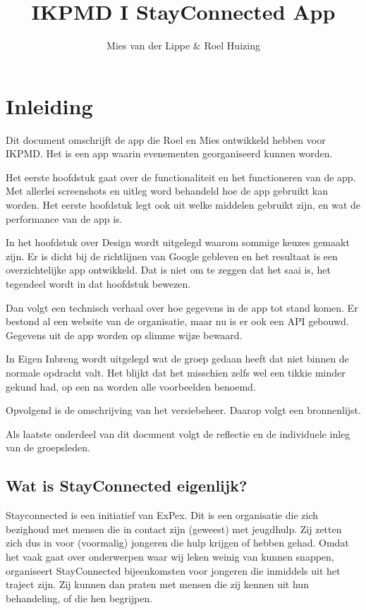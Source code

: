 \documentclass[dutch]{report}
\author{Mies van der Lippe \& Roel Huizing}
\title{IKPMD I StayConnected App}
\begin{document}
	
	
	\tableofcontents

	\newpage
	
	\section{Inleiding}
	Dit document omschrijft de app die Roel en Mies ontwikkeld hebben voor IKPMD. Het is een app waarin evenementen georganiseerd kunnen worden. 
	
	Het eerste hoofdstuk gaat over de functionaliteit en het functioneren van de app. Met allerlei screenshots en uitleg word behandeld hoe de 
	app gebruikt kan worden. Het eerste hoofdstuk legt ook uit welke middelen gebruikt zijn, en wat de performance van de app is. 
	
	In het hoofdstuk over Design wordt uitgelegd waarom sommige keuzes gemaakt zijn. Er is dicht bij de richtlijnen van Google gebleven en 
	het resultaat is een overzichtelijke app ontwikkeld. Dat is niet om te zeggen dat het saai is, het tegendeel wordt in dat hoofdstuk bewezen. 
	
	Dan volgt een technisch verhaal over hoe gegevens in de app tot stand komen. Er bestond al een website van de organisatie, maar nu is er ook 
	een API gebouwd. Gegevens uit de app worden op slimme wijze bewaard. 
	
	In Eigen Inbreng wordt uitgelegd wat de groep gedaan heeft dat niet binnen de normale opdracht valt. Het blijkt dat het misschien zelfs wel een
	tikkie minder gekund had, op een na worden alle voorbeelden benoemd. 
	
	Opvolgend is de omschrijving van het versiebeheer. Daarop volgt een bronnenlijst. 
	
	Als laatste onderdeel van dit document volgt de reflectie en de individuele inleg van de groepsleden. 
	
	\subsection{Wat is StayConnected eigenlijk?}
	Stayconnected is een initiatief van ExPex. Dit is een organisatie die zich bezighoud met mensen die in contact zijn (geweest) met jeugdhulp. Zij 
	zetten zich dus in voor (voormalig) jongeren die hulp krijgen of hebben gehad. Omdat het vaak gaat over onderwerpen waar wij leken weinig van 
	kunnen snappen, organiseert StayConnected bijeenkomsten voor jongeren die inmiddels uit het traject zijn. Zij kunnen dan praten met mensen 
	die zij kennen uit hun behandeling, of die hen begrijpen. 
	
\end{document}
